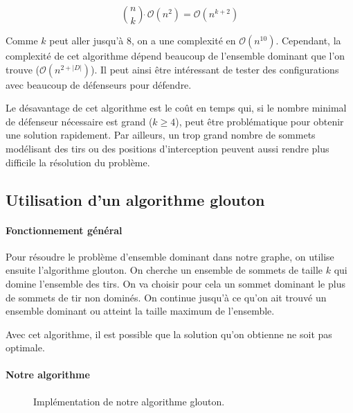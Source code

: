 \documentclass[12pt]{article}
\begin{document}
\begin{equation*}
  \binom{n}{k} \dot\  \mathcal{O}(n^{2}) = \mathcal{O}(n^{k+2})
\end{equation*}

Comme $k$ peut aller jusqu'à 8, on a une complexité en $\mathcal{O}(n^{10})$. Cependant, la complexité de cet algorithme dépend beaucoup de l'ensemble dominant que l'on trouve ($\mathcal{O}(n^{2+|D|})$). Il peut ainsi être intéressant de tester des configurations avec beaucoup de défenseurs pour défendre.

Le désavantage de cet algorithme est le coût en temps qui, si le nombre minimal de défenseur nécessaire est grand ($k \geqslant 4$), peut être problématique pour obtenir une solution rapidement. Par ailleurs, un trop grand nombre de sommets modélisant des tirs ou des positions d'interception peuvent aussi rendre plus difficile la résolution du problème.

\subsection{Utilisation d'un algorithme glouton}

\paragraph{Fonctionnement général} Pour résoudre le problème d'ensemble dominant dans notre graphe, on utilise ensuite l'algorithme glouton. On cherche un ensemble de sommets de taille $k$ qui domine l'ensemble des tirs. On va choisir pour cela un sommet dominant le plus de sommets de tir non dominés. On continue jusqu'à ce qu'on ait trouvé un ensemble dominant ou atteint la taille maximum de l'ensemble.

Avec cet algorithme, il est possible que la solution qu'on obtienne ne soit pas optimale.


\paragraph{Notre algorithme}

\begin{figure}[h!]
  \begin{algorithm}[H]
    \BlankLine
  \end{algorithm}
  \caption{Implémentation de notre algorithme glouton.}
\end{figure}
\end{document}
